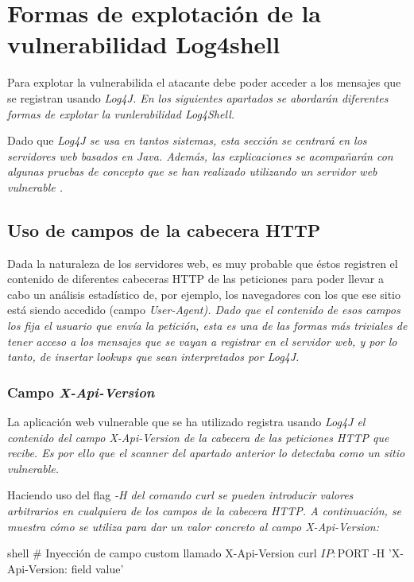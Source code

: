 \documentclass[../main.tex]{subfiles}
\begin{document}
\section{Formas de explotación de la vulnerabilidad Log4shell}

Para explotar la vulnerabilida el atacante debe poder acceder a los mensajes que se registran usando \it{Log4J}. En los siguientes apartados se abordarán diferentes formas de explotar la vunlerabilidad \it{Log4Shell}.

Dado que \it{Log4J} se usa en tantos sistemas, esta sección se centrará en los servidores web basados en Java. Además, las explicaciones se acompañarán con algunas pruebas de concepto que se han realizado utilizando un servidor web vulnerable \cite{vulnerable-app}.

\subsection{Uso de campos de la cabecera HTTP}

Dada la naturaleza de los servidores web, es muy probable que éstos registren el contenido de diferentes cabeceras HTTP de las peticiones para poder llevar a cabo un análisis estadístico de, por ejemplo, los navegadores con los que ese sitio está siendo accedido (campo \it{User-Agent}). Dado que el contenido de esos campos los fija el usuario que envía la petición, esta es una de las formas más triviales de tener acceso a los mensajes que se vayan a registrar en el servidor web, y por lo tanto, de insertar \it{lookups} que sean interpretados por \it{Log4J}.

\subsubsection{Campo \it{X-Api-Version}}

La aplicación web vulnerable que se ha utilizado \cite{vulnerable-app} registra usando \it{Log4J} el contenido del campo \it{X-Api-Version} de la cabecera de las peticiones HTTP que recibe. Es por ello que el scanner del apartado anterior lo detectaba como un sitio vulnerable.

Haciendo uso del flag \it{-H} del comando \it{curl} se pueden introducir valores arbitrarios en cualquiera de los campos de la cabecera HTTP. A continuación, se muestra cómo se utiliza para dar un valor concreto al campo \it{X-Api-Version}:
\begin{codigo}{shell}
# Inyección de campo custom llamado X-Api-Version
curl ${IP}:${PORT} -H 'X-Api-Version: field value'
\end{codigo}
\end{document}
